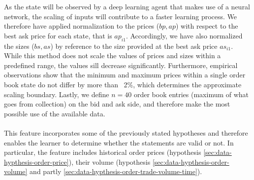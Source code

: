 As the state will be observed by a deep learning agent that makes use of a neural network, the scaling of inputs will contribute to a faster learning process.
We therefore have applied normalization to the prices ($bp, ap$) with respect to the best ask price for each state, that is $ap_{i1}$.
Accordingly, we have also normalized the sizes ($bs, as$) by reference to the size provided at the best ask price $as_{i1}$.
While this method does not scale the values of prices and sizes within a predefined range, the values sill decrease significantly.
Furthermore, empirical observations show that the minimum and maximum prices within a single order book state do not differ by more than ~2\%, which determines the approximate scaling boundary.
Lastly, we define $n=40$ order book entries (maximum of what goes from collection) on the bid and ask side, and therefore make the most possible use of the available data.
\\
\\
This feature incorporates some of the previously stated hypotheses and therefore enables the learner to determine whether the statements are valid or not.
In particular, the feature includes historical order prices (hypothesis \ref{sec:data-hypthesis-order-price}), their volume (hypothesis \ref{sec:data-hypthesis-order-volume} and partly \ref{sec:data-hypthesis-order-trade-volume-time}).

